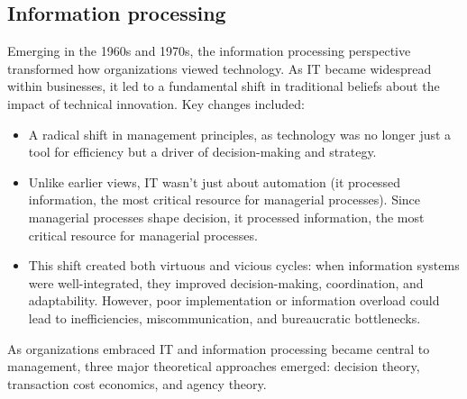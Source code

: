 \subsection{Information processing}
Emerging in the 1960s and 1970s, the information processing perspective transformed how organizations viewed technology. 
As IT became widespread within businesses, it led to a fundamental shift in traditional beliefs about the impact of technical innovation.
Key changes included:
\begin{itemize}
    \item A radical shift in management principles, as technology was no longer just a tool for efficiency but a driver of decision-making and strategy.
    \item Unlike earlier views, IT wasn't just about automation (it processed information, the most critical resource for managerial processes).
        Since managerial processes shape decision, it processed information, the most critical resource for managerial processes.
    \item This shift created both virtuous and vicious cycles: when information systems were well-integrated, they improved decision-making, coordination, and adaptability.
        However, poor implementation or information overload could lead to inefficiencies, miscommunication, and bureaucratic bottlenecks.
\end{itemize}
As organizations embraced IT and information processing became central to management, three major theoretical approaches emerged: decision theory, transaction cost economics, and agency theory.